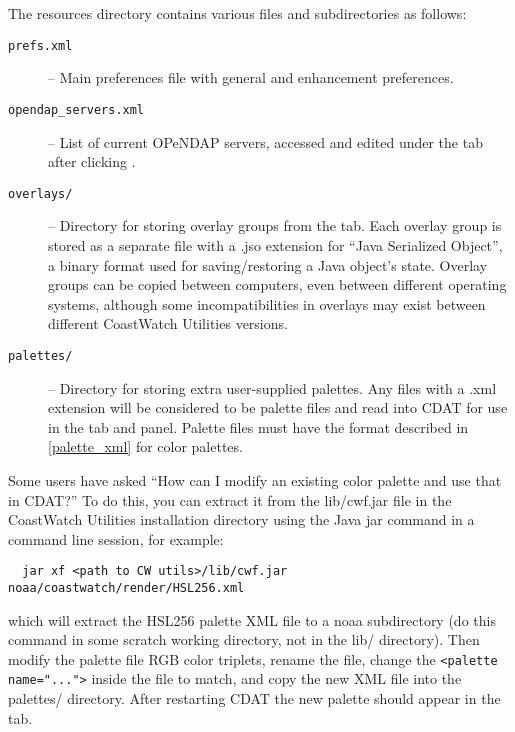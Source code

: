 The resources directory contains various files and subdirectories
as follows:
\begin{description}

\item[{\tt prefs.xml}] -- Main preferences file with general and
enhancement preferences.

\item[{\tt opendap\_servers.xml}] -- List of current OPeNDAP
servers, accessed and edited under the
 tab after clicking
.

\item[{\tt overlays/}] -- Directory for storing overlay groups
from the  tab.  Each overlay group
is stored as a separate file with a {\file .jso} extension for
``Java Serialized Object'', a binary format used for
saving/restoring a Java object's state.  Overlay groups can be
copied between computers, even between different operating
systems, although some incompatibilities in overlays may exist
between different CoastWatch Utilities versions.

\item[{\tt palettes/}] -- Directory for storing extra
user-supplied palettes.  Any files with a {\file .xml} extension
will be considered to be palette files and read into CDAT for use
in the  tab and
 panel.  Palette files must have
the format described in \autoref{palette_xml} for color palettes.

\end{description}

Some users have asked ``How can I modify an existing color
palette and use that in CDAT?''  To do this, you can extract it
from the {\file lib/cwf.jar} file in the CoastWatch Utilities
installation directory using the Java jar command in a command
line session, for example:
\begin{verbatim}
  jar xf <path to CW utils>/lib/cwf.jar noaa/coastwatch/render/HSL256.xml
\end{verbatim}
which will extract the HSL256 palette XML file to a {\file noaa}
subdirectory (do this command in some scratch working directory,
not in the {\file lib/} directory).  Then modify the palette file
RGB color triplets, rename the file, change the
\verb+<palette name="...">+ inside the file to match, and copy
the new XML file into the {\file palettes/} directory.  After
restarting CDAT the new palette should appear in the
 tab.

